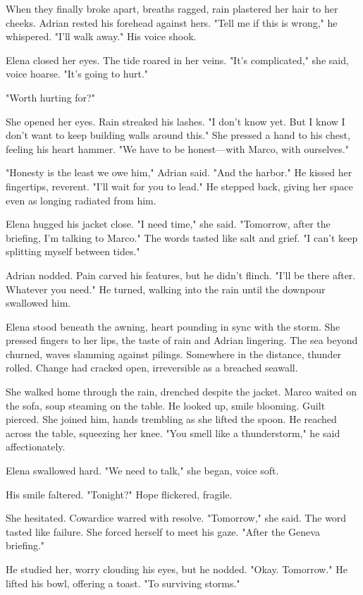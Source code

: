 When they finally broke apart, breaths ragged, rain plastered her hair to her cheeks. Adrian rested his forehead against hers. "Tell me if this is wrong," he whispered. "I'll walk away." His voice shook.

Elena closed her eyes. The tide roared in her veins. "It's complicated," she said, voice hoarse. "It's going to hurt."

"Worth hurting for?"

She opened her eyes. Rain streaked his lashes. "I don't know yet. But I know I don't want to keep building walls around this." She pressed a hand to his chest, feeling his heart hammer. "We have to be honest—with Marco, with ourselves."

"Honesty is the least we owe him," Adrian said. "And the harbor." He kissed her fingertips, reverent. "I'll wait for you to lead." He stepped back, giving her space even as longing radiated from him.

Elena hugged his jacket close. "I need time," she said. "Tomorrow, after the briefing, I'm talking to Marco." The words tasted like salt and grief. "I can't keep splitting myself between tides."

Adrian nodded. Pain carved his features, but he didn't flinch. "I'll be there after. Whatever you need." He turned, walking into the rain until the downpour swallowed him.

Elena stood beneath the awning, heart pounding in sync with the storm. She pressed fingers to her lips, the taste of rain and Adrian lingering. The sea beyond churned, waves slamming against pilings. Somewhere in the distance, thunder rolled. Change had cracked open, irreversible as a breached seawall.

She walked home through the rain, drenched despite the jacket. Marco waited on the sofa, soup steaming on the table. He looked up, smile blooming. Guilt pierced. She joined him, hands trembling as she lifted the spoon. He reached across the table, squeezing her knee. "You smell like a thunderstorm," he said affectionately.

Elena swallowed hard. "We need to talk," she began, voice soft.

His smile faltered. "Tonight?" Hope flickered, fragile.

She hesitated. Cowardice warred with resolve. "Tomorrow," she said. The word tasted like failure. She forced herself to meet his gaze. "After the Geneva briefing."

He studied her, worry clouding his eyes, but he nodded. "Okay. Tomorrow." He lifted his bowl, offering a toast. "To surviving storms."

